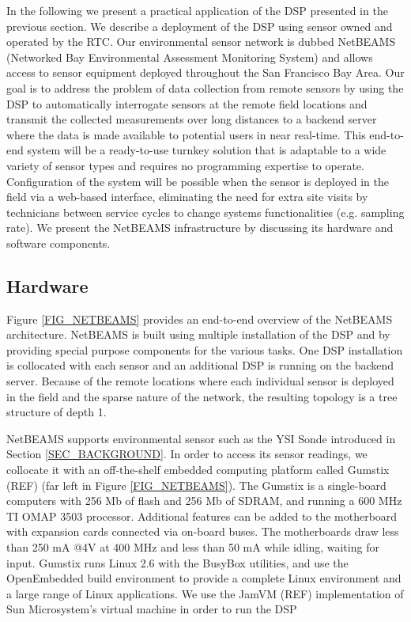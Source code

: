 \documentclass[conference]{IEEEtran}
\begin{document}
In the following we present a practical application of the DSP
presented in the previous section. We describe a deployment of the DSP
using sensor owned and operated by the RTC. Our environmental sensor
network is dubbed NetBEAMS (Networked Bay Environmental Assessment
Monitoring System) and allows access to sensor equipment deployed
throughout the San Francisco Bay Area.  Our goal is to address the
problem of data collection from remote sensors by using the DSP to
automatically interrogate sensors at the remote field locations and
transmit the collected measurements over long distances to a backend
server where the data is made available to potential users in near
real-time. This end-to-end system will be a ready-to-use turnkey
solution that is adaptable to a wide variety of sensor types and
requires no programming expertise to operate. Configuration of the
system will be possible when the sensor is deployed in the field via a
web-based interface, eliminating the need for extra site visits by
technicians between service cycles to change systems functionalities
(e.g. sampling rate). We present the NetBEAMS infrastructure by
discussing its hardware and software components.



\subsection{Hardware}

Figure \ref{FIG_NETBEAMS} provides an end-to-end overview of the
NetBEAMS architecture. NetBEAMS is built using multiple installation
of the DSP and by providing special purpose components for the various
tasks. One DSP installation is collocated with each sensor and an
additional DSP is running on the backend server. Because of the remote
locations where each individual sensor is deployed in the field and
the sparse nature of the network, the resulting topology is a tree
structure of depth 1.


\begin{figure*}
\centering
{}
\caption{\label{FIG_NETBEAMS} NetBEAMS architecture.}
\end{figure*}

NetBEAMS supports environmental sensor such as the YSI Sonde
introduced in Section \ref{SEC_BACKGROUND}. In order to access its
sensor readings, we collocate it with an off-the-shelf embedded
computing platform called Gumstix (REF) (far left in Figure
\ref{FIG_NETBEAMS}). The Gumstix is a single-board computers with 256
Mb of flash and 256 Mb of SDRAM, and running a 600 MHz TI OMAP 3503
processor. Additional features can be added to the motherboard with
expansion cards connected via on-board buses. The motherboards draw
less than 250 mA @4V at 400 MHz and less than 50 mA while idling,
waiting for input.  Gumstix runs Linux 2.6 with the BusyBox utilities,
and use the OpenEmbedded build environment to provide a complete Linux
environment and a large range of Linux applications. We use the JamVM
(REF) implementation of Sun Microsystem's virtual machine in order to
run the DSP
\end{document}
